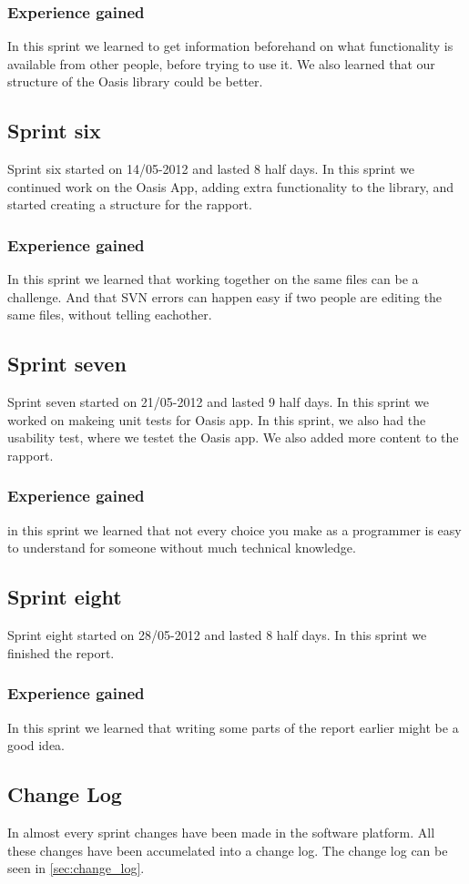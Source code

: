 \subsubsection{Experience gained}
In this sprint we learned to get information beforehand on what functionality is available from other people, before trying to use it. We also learned that our structure of the Oasis library could be better.

\subsection{Sprint six}
Sprint six started on 14/05-2012 and lasted 8 half days. In this sprint we continued work on the Oasis App, adding extra functionality to the library, and started creating a structure for the rapport.

\subsubsection{Experience gained}
In this sprint we learned that working together on the same files can be a challenge. And that SVN errors can happen easy if two people are editing the same files, without telling eachother.

\subsection{Sprint seven}
Sprint seven started on 21/05-2012 and lasted 9 half days. In this sprint we worked on makeing unit tests for Oasis app. In this sprint, we also had the usability test, where we testet the Oasis app. We also added more content to the rapport.

\subsubsection{Experience gained}
in this sprint we learned that not every choice you make as a programmer is easy to understand for someone without much technical knowledge.

\subsection{Sprint eight}
Sprint eight started on 28/05-2012 and lasted 8 half days. In this sprint we finished the report.

\subsubsection{Experience gained}
In this sprint we learned that writing some parts of the report earlier might be a good idea.

\subsection{Change Log}
In almost every sprint changes have been made in the software platform.
All these changes have been accumelated into a change log.
The change log can be seen in \autoref{sec:change_log}.